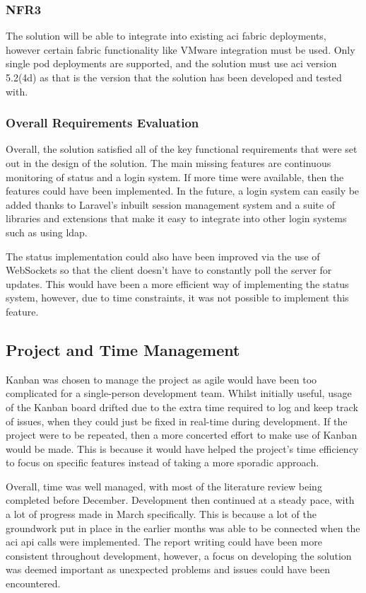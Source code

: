 \subsubsection{NFR3}
The solution will be able to integrate into existing \gls{aci} fabric deployments, however certain fabric functionality like VMware integration must be used. Only single pod deployments are supported, and the solution must use \gls{aci} version 5.2(4d) as that is the version that the solution has been developed and tested with.

\subsubsection{Overall Requirements Evaluation}
Overall, the solution satisfied all of the key functional requirements that were set out in the design of the solution. The main missing features are continuous monitoring of status and a login system. If more time were available, then the features could have been implemented. In the future, a login system can easily be added thanks to Laravel's inbuilt session management system and a suite of libraries and extensions that make it easy to integrate into other login systems such as using \gls{ldap}.

The status implementation could also have been improved via the use of WebSockets so that the client doesn't have to constantly poll the server for updates. This would have been a more efficient way of implementing the status system, however, due to time constraints, it was not possible to implement this feature.

\subsection{Project and Time Management}
Kanban was chosen to manage the project as agile would have been too complicated for a single-person development team. Whilst initially useful, usage of the Kanban board drifted due to the extra time required to log and keep track of issues, when they could just be fixed in real-time during development. If the project were to be repeated, then a more concerted effort to make use of Kanban would be made. This is because it would have helped the project's time efficiency to focus on specific features instead of taking a more sporadic approach.

Overall, time was well managed, with most of the literature review being completed before December. Development then continued at a steady pace, with a lot of progress made in March specifically. This is because a lot of the groundwork put in place in the earlier months was able to be connected when the \gls{aci} \gls{api} calls were implemented. The report writing could have been more consistent throughout development, however, a focus on developing the solution was deemed important as unexpected problems and issues could have been encountered.

